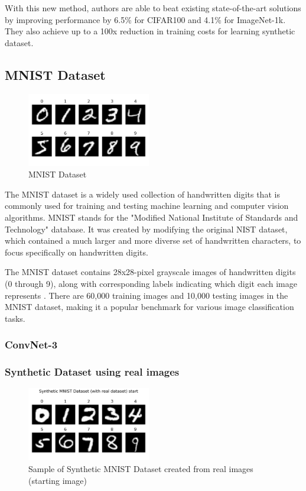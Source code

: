 \documentclass[conference, compsoc]{IEEEtran}
\begin{document}
With this new method, authors are able to beat existing state-of-the-art solutions by improving performance by 6.5\% for CIFAR100 and 4.1\% for ImageNet-1k. They also achieve up to a 100x reduction in training costs for learning synthetic dataset.
 
\subsection{MNIST Dataset}
\begin{figure}[H]
	\centering
	\includegraphics[width=0.48\textwidth]{MNIST_dataset.png}
	\caption{MNIST Dataset \cite{deng2012mnist}}
	\label{fig:mnist_dataset}
\end{figure}
The MNIST dataset is a widely used collection of handwritten digits that is commonly used for training and testing machine learning and computer vision algorithms. MNIST stands for the "Modified National Institute of Standards and Technology" database. It was created by modifying the original NIST dataset, which contained a much larger and more diverse set of handwritten characters, to focus specifically on handwritten digits.

The MNIST dataset contains 28x28-pixel grayscale images of handwritten digits (0 through 9), along with corresponding labels indicating which digit each image represents \cite{deng2012mnist}. There are 60,000 training images and 10,000 testing images in the MNIST dataset, making it a popular benchmark for various image classification tasks.
\subsubsection{ConvNet-3}
\subsubsection{Synthetic Dataset using real images}
\begin{figure}[H]
	\centering
	\includegraphics[width=0.48\textwidth]{mnist_real_sample.png}
	\caption{Sample of Synthetic MNIST Dataset created from real images (starting image)}
	\label{fig:mnist_real_sample}
\end{figure}
\end{document}
